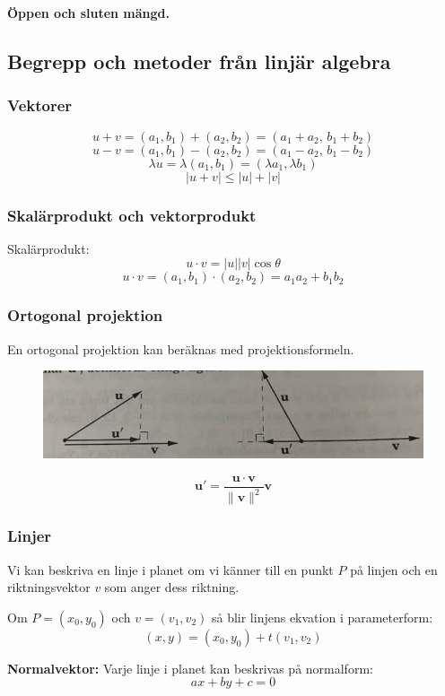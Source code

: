 \documentclass[a4paper,12pt]{article}
\begin{document}
\textbf{Öppen och sluten mängd.}

\subsection{Begrepp och metoder från linjär algebra}

\subsubsection*{Vektorer}
\[
u + v = (a_1,b_1) + (a_2,b_2) = (a_1+a_2, \, b_1+b_2)
\]
\[
u - v = (a_1,b_1) - (a_2,b_2) = (a_1-a_2, \, b_1-b_2)
\]
\[
\lambda u = \lambda (a_1, b_1) = (\lambda a_1, \lambda b_1)
\]
\[
|u+v| \leq |u| + |v|
\]

\subsubsection*{Skalärprodukt och vektorprodukt}
Skalärprodukt:
\[
u \cdot v = |u||v|\cos\theta
\]
\[
u \cdot v = (a_1, b_1)\cdot(a_2, b_2) = a_1a_2 + b_1b_2
\]

\subsubsection*{Ortogonal projektion}
En ortogonal projektion kan beräknas med projektionsformeln.
\begin{figure}[H]
  \centering
  \includegraphics[width=1\textwidth]{ortogonalprojektion.png}
  \caption{}
\end{figure}
\[
    \mathbf{u'} =  \frac{\mathbf{u} \cdot \mathbf{v}}{\|\mathbf{v}\|^2} \mathbf{v}
\]

\subsubsection*{Linjer}
Vi kan beskriva en linje i planet om vi känner till en punkt $P$ på linjen och en riktningsvektor $v$ som anger dess riktning.  

Om $P=(x_0, y_0)$ och $v = (v_1, v_2)$ så blir linjens ekvation i parameterform:
\[
(x, y) = (x_0, y_0) + t(v_1, v_2)
\]

\textbf{Normalvektor:}  
Varje linje i planet kan beskrivas på normalform:
\[
ax + by + c = 0
\]
\end{document}

